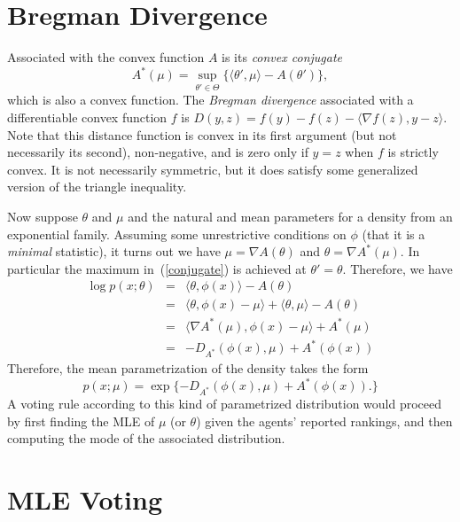 \documentclass[10pt,letterpaper]{article}
\newcommand{\ip}[2]{\ensuremath{\langle #1, #2 \rangle}}
\newcommand{\grad}{\nabla}
\begin{document}

\section{Bregman Divergence}

Associated with the convex function $A$ is its \emph{convex conjugate}
%
\begin{equation} \label{conjugate}
A^*(\mu) = \sup_{\theta' \in \Theta} \{ \ip{\theta'}{\mu} - A(\theta') \},
\end{equation}
%
which is also a convex function. The \emph{Bregman divergence} associated with a differentiable convex function $f$ is $D(y,z) = f(y) - f(z) - \ip{\grad f(z)}{y-z}$. Note that this distance function is convex in its first argument (but not necessarily its second), non-negative, and is zero only if $y=z$ when $f$ is strictly convex. It is not necessarily symmetric, but it does satisfy some generalized version of the triangle inequality.

Now suppose $\theta$ and $\mu$ and the natural and mean parameters for a density from an exponential family. Assuming some unrestrictive conditions on $\phi$ (that it is a \emph{minimal} statistic), it turns out we have $\mu = \grad A(\theta)$ and $\theta = \grad A^*(\mu)$. In particular the maximum in~(\ref{conjugate}) is achieved at $\theta' = \theta$. Therefore, we have
%
\begin{eqnarray*}
\log p(x ; \theta) & = & \ip{\theta}{\phi(x)} - A(\theta) \\
& = & \ip{\theta}{\phi(x) - \mu} + \ip{\theta}{\mu} - A(\theta) \\
& = & \ip{\grad A^*(\mu)}{\phi(x) - \mu} + A^*(\mu) \\
& = & -D_{A^*}(\phi(x), \mu) + A^*(\phi(x))
\end{eqnarray*}
%
Therefore, the mean parametrization of the density takes the form
%
\begin{equation} \label{exp-mean}
p(x ; \mu) = \exp\{ -D_{A^*}(\phi(x), \mu) + A^*(\phi(x)). \}
\end{equation}
%
A voting rule according to this kind of parametrized distribution would proceed by first finding the MLE of $\mu$ (or $\theta$) given the agents' reported rankings, and then computing the mode of the associated distribution.






\section{MLE Voting}
\end{document}
